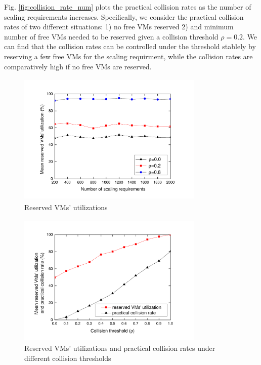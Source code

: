\documentclass[review]{elsarticle}
\begin{document}
Fig. \ref{fig:collision_rate_num} plots the practical collision rates as the number of scaling requirements increases. Specifically, we consider the practical collision rates of two different situations: 1) no free VMs reserved 2) and minimum number of free VMs needed to be reserved given a collision threshold $\rho=0.2$. We can find that the collision rates can be controlled under the threshold stablely by reserving a few free VMs for the scaling requirment, while the collision rates are comparatively high if no free VMs are reserved. 
\begin{figure}[H]
	\centering 
	\includegraphics[width=3.5in,height=2.5in]{fig/vm_util_num_p.pdf}	
	\caption{Reserved VMs' utilizations}
	\label{fig:vm_util_num_p}
\end{figure}
\begin{figure}[H]
	\centering
	\includegraphics[width=3.5in,height=2.5in]{fig/vm_util_p.pdf}	
	\caption{Reserved VMs' utilizations
		and practical collision rates under different collision thresholds}
	\label{fig:vm_util_p}
\end{figure}
\end{document}
